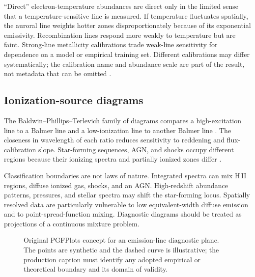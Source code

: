``Direct'' electron-temperature abundances are direct only in the limited sense that
a temperature-sensitive line is measured.  If temperature fluctuates spatially, the
auroral line weights hotter zones disproportionately because of its exponential
emissivity.  Recombination lines respond more weakly to temperature but are faint.
Strong-line metallicity calibrations trade weak-line sensitivity for dependence on a
model or empirical training set.  Different calibrations may differ systematically;
the calibration name and abundance scale are part of the result, not metadata that
can be omitted \citep{KewleyEllison2008,KewleyNichollsSutherland2019}.

\subsection{Ionization-source diagrams}

The Baldwin--Phillips--Terlevich family of diagrams compares a high-excitation line to
a Balmer line and a low-ionization line to another Balmer line
\citep{BaldwinPhillipsTerlevich1981}.  The closeness in wavelength of each ratio
reduces sensitivity to reddening and flux-calibration slope.  Star-forming sequences,
AGN, and shocks occupy different regions because their ionizing spectra and partially
ionized zones differ \citep{KewleyEtAl2001,KauffmannEtAl2003}.

Classification boundaries are not laws of nature.  Integrated spectra can mix H\,II
regions, diffuse ionized gas, shocks, and an AGN.  High-redshift abundance patterns,
pressures, and stellar spectra may shift the star-forming locus.  Spatially resolved
data are particularly vulnerable to low equivalent-width diffuse emission and to
point-spread-function mixing.  Diagnostic diagrams should be treated as projections
of a continuous mixture problem.

\begin{figure}[tbp]
\centering
{}
\caption{Original PGFPlots concept for an emission-line diagnostic plane.  The
points are synthetic and the dashed curve is illustrative; the production caption
must identify any adopted empirical or theoretical boundary and its domain of
validity.}
\label{fig:diagnostic-plane-concept}
\end{figure}


